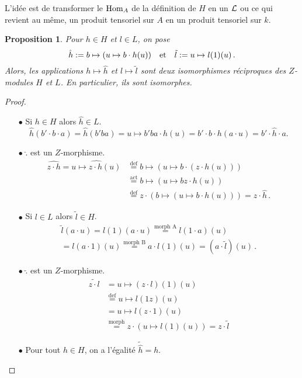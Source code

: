 \documentclass[francais,a4paper,11pt,reqno]{amsart}
\theoremstyle{plain}
\newtheorem{PROP}[THEO]{\bf Proposition}
\theoremstyle{definition}
\theoremstyle{remark}
\newcommand{\act}{\cdot}
\newcommand\eqcom[1]{\mathrel{\overset{\text{#1}}{=}}}
\begin{document}
L'idée est de transformer le $\operatorname{Hom}_A$ de la définition de $H$ en un $\operatorname{\mathcal L}$ ou
ce qui revient au même, un produit tensoriel sur $A$ en un produit tensoriel
sur $k$.
\begin{PROP}
  Pour $h\in H$ et $l\in L$, on pose
  \begin{equation}
    \hat{h} := b \mapsto (u \mapsto b\act h(u))
    \qandq
    \tilde{l} := u \mapsto l(1)(u)\,.
  \end{equation}
  Alors, les applications $h\mapsto\hat{h}$ et $l\mapsto\tilde{l}$ sont deux
  isomorphismes réciproques des $Z$-modules $H$ et $L$. En particulier, ils
  sont isomorphes.
\end{PROP}
\begin{proof}
  \begin{itemize}
  \item[$\bullet$] Si $h\in H$ alors $\hat{h}\in L$.
    \begin{equation}
      \hat h(b'\act b\act a) = \hat h(b'ba) = u\mapsto b'ba \act h(u)
      = b'\act b\act h(a\act u) = b' \act \hat{h} \act a.
    \end{equation}
  \item[$\bullet$] $\hat{.}$ est un $Z$-morphisme.
    \begin{align}
      \widehat{z\act h} = \widehat{u\mapsto z\act h(u)}
      &\eqcom{def}b\mapsto(u\mapsto b\act(z\act h(u)))\\
      &\eqcom{act}b\mapsto(u\mapsto bz\act h(u))\\
      &\eqcom{def}z\act(b\mapsto(u\mapsto b\act h(u)))=z\act\hat{h}\,.
    \end{align}
  \item[$\bullet$] Si $l\in L$ alors $\tilde{l}\in H$.
    \begin{multline}
      \tilde{l}(a\act u) = l(1)(a\act u)
      \eqcom{morph A}l(1\act a)(u)\\
      = l(a\act 1)(u)
      \eqcom{morph B}a\act l(1)(u) = (a\act \tilde{l})(u)\,.
    \end{multline}
  \item[$\bullet$] $\tilde{.}$ est un $Z$-morphisme.
    \begin{align}
      \widetilde{z\act l}&=u\mapsto (z\act l)(1)(u)\\
      &\eqcom{def}u\mapsto l(1z)(u)\\
      &=u\mapsto l(z\act 1)(u)\\
      &\eqcom{morph}z\act (u\mapsto l(1)(u))= z\act \tilde{l}
    \end{align}
  \item[$\bullet$] Pour tout $h\in H$, on a l'égalité $\tilde{\hat{h}} = h$.

\end{itemize}
\end{proof}
\end{document}
